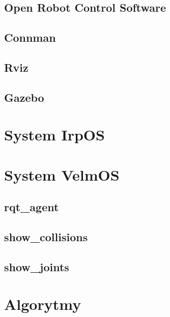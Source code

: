 		\subsection{Open Robot Control Software}
		\label{ss:orocos}
		\subsection{Connman}
		\label{ss:connman}
		\subsection{Rviz}
		\label{ss:rviz}
		\subsection{Gazebo}
		\label{ss:gazebo}
	\section{System IrpOS}
	\label{s:irpos}
	\section{System VelmOS}
	\label{s:velmos}
		\subsection{rqt\_agent}
		\label{ss:rqt_agent}
		\subsection{show\_collisions}
		\label{ss:show_collisions}
		\subsection{show\_joints}
		\label{ss:show_joints}
		
	\section{Algorytmy}
	\label{s:algorytmy}